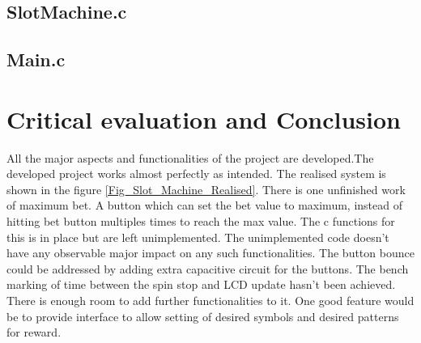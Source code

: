 \documentclass[a4paper,13pt,openany,sffamily]{memoir}
\begin{document}
\newpage
\section{SlotMachine.c}
\begin{small}

\end{small}


\newpage
\section{Main.c}
\begin{small}

\end{small}




\chapter {Critical evaluation and Conclusion}
All the major aspects and functionalities of the project are developed.The developed project works almost perfectly as intended. The realised system is shown in the figure \ref{Fig_Slot_Machine_Realised}. There is one unfinished work of maximum bet. A button which can set the bet value to maximum, instead of hitting bet button multiples times to reach the max value. The c functions for this is in place but are left unimplemented. The unimplemented code doesn't have any observable major impact on any such functionalities. The button bounce could be addressed by adding extra capacitive circuit for the buttons. The bench marking of time between the spin stop and LCD update hasn't been achieved. There is enough room to add further functionalities to it. One good feature would be to provide interface to allow setting of desired symbols and desired patterns for reward.   
\end{document}
